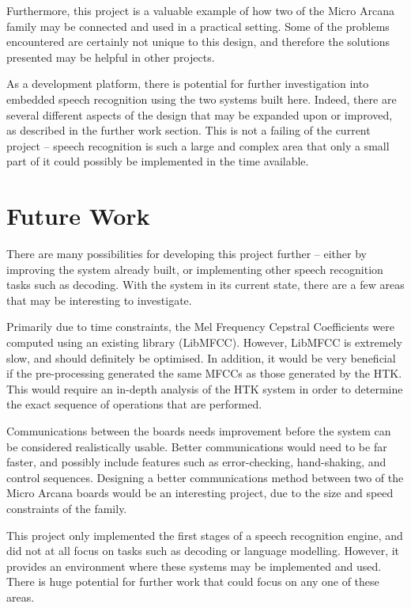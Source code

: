 	Furthermore, this project is a valuable example of how two of the Micro Arcana family may be connected and used in a practical setting.  Some of the problems encountered are certainly not unique to this design, and therefore the solutions presented may be helpful in other projects.

	As a development platform, there is potential for further investigation into embedded speech recognition using the two systems built here.  Indeed, there are several different aspects of the design that may be expanded upon or improved, as described in the further work section.  This is not a failing of the current project -- speech recognition is such a large and complex area that only a small part of it could possibly be implemented in the time available.


\section{Future Work} %
\label{sec:future_work}
	There are many possibilities for developing this project further -- either by improving the system already built, or implementing other speech recognition tasks such as decoding.  With the system in its current state, there are a few areas that may be interesting to investigate.

	Primarily due to time constraints, the Mel Frequency Cepstral Coefficients were computed using an existing library (LibMFCC).  However, LibMFCC is extremely slow, and should definitely be optimised.  In addition, it would be very beneficial if the pre-processing generated the same MFCCs as those generated by the HTK.  This would require an in-depth analysis of the HTK system in order to determine the exact sequence of operations that are performed.

	Communications between the boards needs improvement before the system can be considered realistically usable.  Better communications would need to be far faster, and possibly include features such as error-checking, hand-shaking, and control sequences.  Designing a better communications method between two of the Micro Arcana boards would be an interesting project, due to the size and speed constraints of the family.

	This project only implemented the first stages of a speech recognition engine, and did not at all focus on tasks such as decoding or language modelling.  However, it provides an environment where these systems may be implemented and used.  There is huge potential for further work that could focus on any one of these areas.


